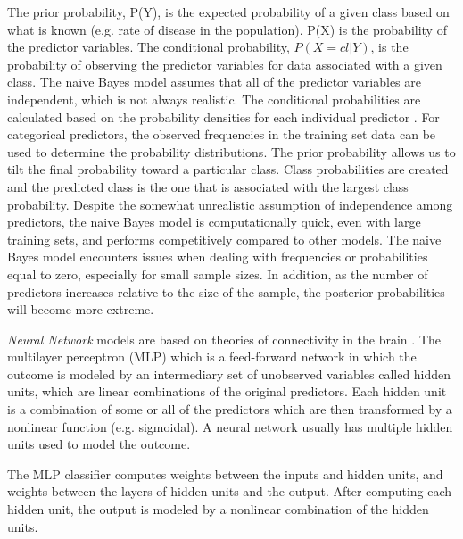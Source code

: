 The prior probability, P(Y), is the expected probability of a given class 
based on what is known (e.g. rate of disease in the population). P(X) 
is the probability of the predictor variables. The conditional probability,
$P(X=cl|Y)$, is the probability of observing the predictor variables for data 
associated with a given class. The naive Bayes model assumes that all of the 
predictor variables are independent, which is not always realistic. The 
conditional probabilities are calculated based on the probability densities 
for each individual predictor \cite{kuhn13}. For categorical predictors, the 
observed frequencies in the training set data can be used to determine the 
probability distributions. The prior probability allows us to tilt the final 
probability toward a particular class. Class probabilities are created and 
the predicted class is the one that is associated with the largest class
probability. Despite the somewhat unrealistic assumption of independence among
predictors, the naive Bayes model is computationally quick, even with large 
training sets, and performs competitively compared to other models. The naive 
Bayes model encounters issues when dealing with frequencies or probabilities 
equal to zero, especially for small sample sizes. In addition, as the number 
of predictors increases relative to the size of the sample, the posterior 
probabilities will become more extreme.


\emph{Neural Network} models are based on theories of connectivity in the brain \cite{kuhn13}. The multilayer perceptron (MLP) which is a feed-forward network 
in which the outcome is modeled by an intermediary set of unobserved variables called hidden units, which are linear combinations of the original predictors. 
Each hidden unit is a combination of some or all of the predictors which are 
then transformed by a nonlinear function (e.g. sigmoidal). A neural network 
usually has multiple hidden units used 
to model the outcome. 

The MLP classifier computes weights between the inputs 
and hidden units, and weights between the layers of hidden units and the 
output. After computing each hidden unit, the output is modeled by a nonlinear 
combination of the hidden units. 

